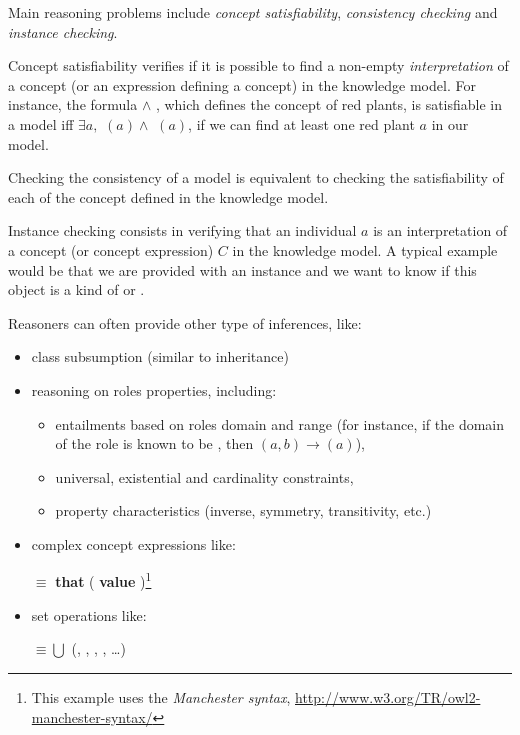 Main reasoning problems include \emph{concept satisfiability},
\emph{consistency checking} and \emph{instance checking}.

Concept satisfiability verifies if it is possible to find a non-empty
\emph{interpretation} of a concept (or an expression defining a concept) in the
knowledge model. For instance, the formula  $\land$
, which defines the concept of red plants, is satisfiable in a
model  iff $\exists a, $ $(a) \land$
$(a)$, \ie if we can find at least one red plant $a$ in our
model.

Checking the consistency of a model is equivalent to checking the
satisfiability of each of the concept defined in the knowledge model.

Instance checking consists in verifying that an individual $a$ is an
interpretation of a concept (or concept expression) $C$ in the knowledge model.
A typical example would be that we are provided with an instance
 and we want to know if this object is a kind of
 or .

Reasoners can often provide other type of inferences, like:

\begin{itemize}
    \item class subsumption (similar to inheritance)

    \item reasoning on roles properties, including:
        \begin{itemize}
        \item entailments based on roles domain and range (for instance, if the
        domain of the role  is known to be
        , then $(a, b) \to
        $$(a)$),

        \item universal, existential and cardinality constraints,

        \item property characteristics (inverse, symmetry, transitivity, etc.)

        \end{itemize}

    \item complex concept expressions like: \par \footnotesize {}
    $\equiv$  {\bf that} ( {\bf value}
    )\footnote{This example uses the \emph{Manchester
    syntax}, \url{http://www.w3.org/TR/owl2-manchester-syntax/}} \normalsize

    \item set operations like: \par \footnotesize {} $\equiv \bigcup$ (, , ,
    , \ldots) \normalsize

\end{itemize}

